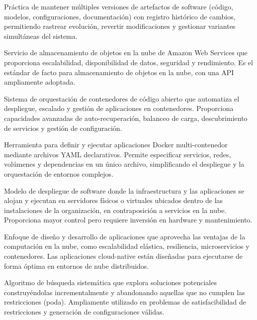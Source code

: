 \begin{description}[style=nextline,leftmargin=0pt]
    \item[Versionamiento]
    Práctica de mantener múltiples versiones de artefactos de software (código, modelos, configuraciones, documentación) con registro histórico de cambios, permitiendo rastrear evolución, revertir modificaciones y gestionar variantes simultáneas del sistema.
    
    \item[Amazon S3 (\textit{Simple Storage Service})]
    Servicio de almacenamiento de objetos en la nube de Amazon Web Services que proporciona escalabilidad, disponibilidad de datos, seguridad y rendimiento. Es el estándar de facto para almacenamiento de objetos en la nube, con una API ampliamente adoptada.
    
    \item[Kubernetes]
    Sistema de orquestación de contenedores de código abierto que automatiza el despliegue, escalado y gestión de aplicaciones en contenedores. Proporciona capacidades avanzadas de auto-recuperación, balanceo de carga, descubrimiento de servicios y gestión de configuración.
    
    \item[Docker Compose]
    Herramienta para definir y ejecutar aplicaciones Docker multi-contenedor mediante archivos YAML declarativos. Permite especificar servicios, redes, volúmenes y dependencias en un único archivo, simplificando el despliegue y la orquestación de entornos complejos.
    
    \item[On-Premise]
    Modelo de despliegue de software donde la infraestructura y las aplicaciones se alojan y ejecutan en servidores físicos o virtuales ubicados dentro de las instalaciones de la organización, en contraposición a servicios en la nube. Proporciona mayor control pero requiere inversión en hardware y mantenimiento.
    
    \item[Cloud-Native]
    Enfoque de diseño y desarrollo de aplicaciones que aprovecha las ventajas de la computación en la nube, como escalabilidad elástica, resiliencia, microservicios y contenedores. Las aplicaciones cloud-native están diseñadas para ejecutarse de forma óptima en entornos de nube distribuidos.
    
    \item[Backtracking]
    Algoritmo de búsqueda sistemática que explora soluciones potenciales construyéndolas incrementalmente y abandonando aquellas que no cumplen las restricciones (poda). Ampliamente utilizado en problemas de satisfacibilidad de restricciones y generación de configuraciones válidas.
    

\end{description}
